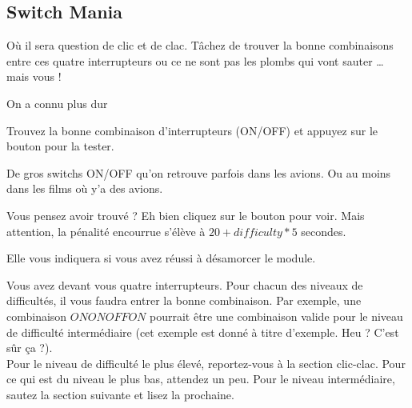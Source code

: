 \subsection{Switch Mania}
Où il sera question de clic et de clac. Tâchez de trouver la bonne combinaisons
entre ces quatre interrupteurs ou ce ne sont pas les plombs qui vont sauter \ldots
mais vous !
\vspace{.5cm}
\begin{modulebox}{}
  \begin{moduleaction}[Difficulté]
    On a connu plus dur
  \end{moduleaction}
  \begin{moduleaction}
    Trouvez la bonne combinaison d'interrupteurs (ON/OFF) et appuyez sur le
    bouton pour la tester.
  \end{moduleaction}
  \begin{moduleaction}[switch]
    De gros switchs ON/OFF qu'on retrouve parfois dans les avions. Ou au moins
    dans les films où y'a des avions.
  \end{moduleaction}
  \begin{moduleaction}[bouton]
    Vous pensez avoir trouvé ? Eh bien cliquez sur le bouton pour voir. Mais
    attention, la pénalité encourrue s'élève à $20 + difficulty * 5$ secondes.
  \end{moduleaction}
  \begin{moduleaction}
    Elle vous indiquera si vous avez réussi à désamorcer le module.
  \end{moduleaction}
\end{modulebox}
\vspace{.5cm}

Vous avez devant vous quatre interrupteurs. Pour chacun des niveaux de
difficultés, il vous faudra entrer la bonne combinaison. Par exemple, une
combinaison $ON ON OFF ON$ pourrait être une combinaison valide pour le niveau
de difficulté intermédiaire (cet exemple est donné à titre d'exemple. Heu ?
C'est sûr ça ?). \\
Pour le niveau de difficulté le plus élevé, reportez-vous à la section
clic-clac. Pour ce qui est du niveau le plus bas, attendez un peu. Pour le
niveau intermédiaire, sautez la section suivante et lisez la prochaine.

